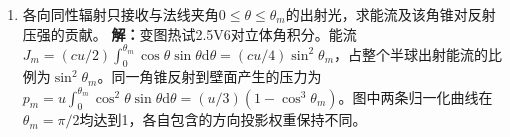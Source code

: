 \documentclass[UTF8,fontset=fandol,a4paper,11pt]{ctexart}
\begin{document}
\begin{enumerate}
\item 各向同性辐射只接收与法线夹角$0\le\theta\le\theta_m$的出射光，求能流及该角锥对反射压强的贡献。
\textbf{解：}变图热试2.5V6对立体角积分。能流$J_m=(cu/2)\int_0^{\theta_m}\cos\theta\sin\theta\mathrm d\theta=(cu/4)\sin^2\theta_m$，占整个半球出射能流的比例为$\sin^2\theta_m$。同一角锥反射到壁面产生的压力为$p_m=u\int_0^{\theta_m}\cos^2\theta\sin\theta\mathrm d\theta=(u/3)(1-\cos^3\theta_m)$。图中两条归一化曲线在$\theta_m=\pi/2$均达到1，各自包含的方向投影权重保持不同。
\begin{center}\begin{minipage}{.98\linewidth}\centering
{}
\end{minipage}
\end{center}
\end{enumerate}
\end{document}
